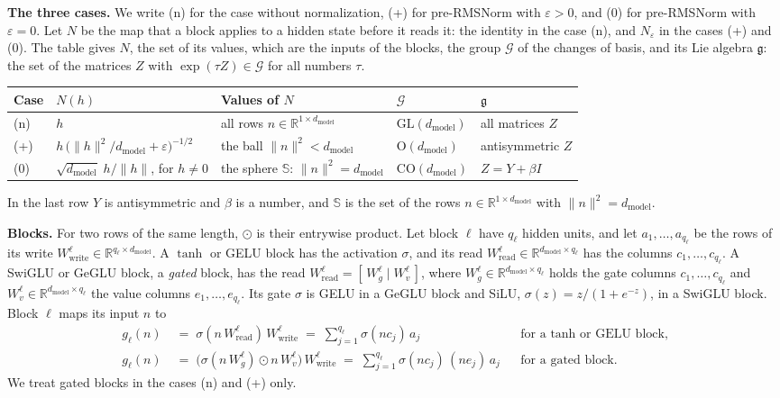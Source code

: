 \documentclass[10pt]{article}
\theoremstyle{definition}
\theoremstyle{remark}
\newcommand{\R}{\mathbb{R}}
\newcommand{\Wread}{W_{\mathrm{read}}}
\newcommand{\Wwrite}{W_{\mathrm{write}}}
\newcommand{\dm}{d_{\mathrm{model}}}
\newcommand{\GL}{\mathrm{GL}}
\newcommand{\Ort}{\mathrm{O}}
\newcommand{\CO}{\mathrm{CO}}
\newcommand{\G}{\mathcal{G}}
\newcommand{\norm}[1]{\lVert #1\rVert}
\newcommand{\para}[1]{\smallskip\noindent\textbf{#1}\hspace{0.5em}}
\begin{document}
\para{The three cases.} We write (n) for the case without normalization, (+) for pre-RMSNorm with $\varepsilon > 0$, and (0) for pre-RMSNorm with $\varepsilon = 0$. Let $N$ be the map that a block applies to a hidden state before it reads it: the identity in the case (n), and $N_\varepsilon$ in the cases (+) and (0). The table gives $N$, the set of its values, which are the inputs of the blocks, the group $\G$ of the changes of basis, and its Lie algebra $\mathfrak g$: the set of the matrices $Z$ with $\exp(\tau Z) \in \G$ for all numbers $\tau$.
\begin{center}\small
\begin{tabular}{@{}lllll@{}}
\toprule
Case & $N(h)$ & Values of $N$ & $\G$ & $\mathfrak g$ \\
\midrule
(n) & $h$ & all rows $n \in \R^{1\times\dm}$ & $\GL(\dm)$ & all matrices $Z$ \\[2pt]
(+) & $h\,\big(\norm{h}^2/\dm + \varepsilon\big)^{-1/2}$ & the ball $\norm{n}^2 < \dm$ & $\Ort(\dm)$ & antisymmetric $Z$ \\[2pt]
(0) & $\sqrt{\dm}\;h/\norm{h}$, for $h \neq 0$ & the sphere $\mathbb S$: $\norm{n}^2 = \dm$ & $\CO(\dm)$ & $Z = Y + \beta I$ \\
\bottomrule
\end{tabular}
\end{center}
In the last row $Y$ is antisymmetric and $\beta$ is a number, and $\mathbb S$ is the set of the rows $n \in \R^{1\times\dm}$ with $\norm{n}^2 = \dm$.

\para{Blocks.} For two rows of the same length, $\odot$ is their entrywise product. Let block $\ell$ have $q_\ell$ hidden units, and let $a_1, \dots, a_{q_\ell}$ be the rows of its write $\Wwrite^{\ell} \in \R^{q_\ell\times\dm}$. A $\tanh$ or GELU block has the activation $\sigma$, and its read $\Wread^{\ell} \in \R^{\dm\times q_\ell}$ has the columns $c_1, \dots, c_{q_\ell}$. A SwiGLU or GeGLU block, a \emph{gated} block, has the read $\Wread^{\ell} = [\,W_g^{\ell} \mid W_v^{\ell}\,]$, where $W_g^{\ell} \in \R^{\dm\times q_\ell}$ holds the gate columns $c_1, \dots, c_{q_\ell}$ and $W_v^{\ell} \in \R^{\dm\times q_\ell}$ the value columns $e_1, \dots, e_{q_\ell}$. Its gate $\sigma$ is GELU in a GeGLU block and SiLU, $\sigma(z) = z/(1 + e^{-z})$, in a SwiGLU block. Block $\ell$ maps its input $n$ to
\begin{align*}
g_\ell(n) \;&=\; \sigma(n\,\Wread^{\ell})\,\Wwrite^{\ell} \;=\; \sum_{j=1}^{q_\ell}\sigma(nc_j)\,a_j && \text{for a $\tanh$ or GELU block,}\\
g_\ell(n) \;&=\; \big(\sigma(n\,W_g^{\ell})\odot n\,W_v^{\ell}\big)\,\Wwrite^{\ell} \;=\; \sum_{j=1}^{q_\ell}\sigma(nc_j)\,(ne_j)\,a_j && \text{for a gated block.}
\end{align*}
We treat gated blocks in the cases (n) and (+) only.
\end{document}
